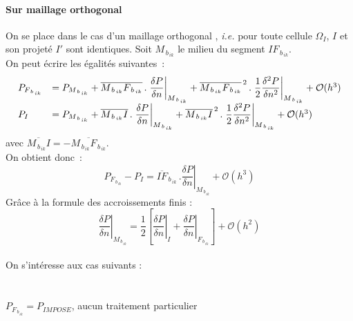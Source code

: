 \paragraph{\bf Sur maillage orthogonal }
On se place dans le cas d'un maillage orthogonal , {\it i.e.} pour
toute cellule $\Omega_I$, $I$ et son projet\'e $I'$ sont identiques.
Soit $M_{\,b_{\,ik}}$ le milieu du segment $IF_{\,b_{\,ik}}$.\\
On peut \'ecrire les \'egalit\'es suivantes~:
\begin{equation}\notag
\begin{array}{ll}
P_{F_{\,b_{\,ik}}} & = P_{M_{\,b_{\,ik}}} + \overline{M_{\,b_{\,ik}}F_{\,b_{\,ik}}}\,.\left. \displaystyle\frac{\delta P}{\delta
n}\right|_{M_{\,b_{\,ik}}} +
\overline{M_{\,b_{\,ik}}F_{\,b_{\,ik}}}^{\,2}\,.\left.\displaystyle\frac{1}{2}\frac{{\delta}^{2} P}{\delta
n^2}\right|_{M_{\,b_{\,ik}}} + \mathcal{O}(h^3)\\
P_I & = P_{M_{\,b_{\,ik}}} + \overline{M_{\,b_{\,ik}}I}\,.
\left. \displaystyle\frac{\delta P}{\delta n}\right|_{M_{\,b_{\,ik}}} +
\overline{M_{\,b_{\,ik}}I}^{\,2}\,.\left.\displaystyle\frac{1}{2}
\frac{{\delta}^{2} P}{\delta n^2}\right|_{M_{\,b_{\,ik}}} + \mathcal{O}(h^3)
\end{array}
\end{equation}
avec $\overline{M_{\,b_{\,ik}}I} = - \overline{M_{\,b_{\,ik}}F_{\,b_{\,ik}}}$.\\
On obtient donc~:
\begin{equation}\label{Base_Gradrc_eq_orthogonal}
P_{F_{\,b_{\,ik}}} - P_I = \overline{IF}_{\,b_{\,ik}}\,.\left. \displaystyle\frac{\delta P}{\delta
n}\right|_{M_{\,b_{\,ik}}} + \mathcal{O}(h^3)
\end{equation}
Gr\^ace \`a la formule des accroissements finis :
\begin{equation}\label{Base_Gradrc_eq_derivee_normale}
\left. \displaystyle\frac{\delta P}{\delta n}\right|_{M_{\,b_{\,ik}}} =
\displaystyle\frac{1}{2}\left[\left. \displaystyle\frac{\delta P}{\delta
n}\right|_{I} +  \left. \displaystyle\frac{\delta P}{\delta
n}\right|_{F_{\,b_{\,ik}}}\right] + \mathcal{O}(h^2)
\end{equation}\\
On s'int\'eresse aux cas suivants :\\\\
\\
$P_{F_{\,b_{\,ik}}} = P_{IMPOSE}$, aucun traitement particulier\\\\
